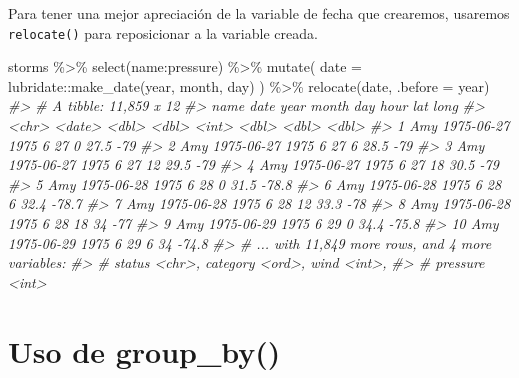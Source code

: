 \documentclass[
]{book}
\newenvironment{Shaded}{\begin{snugshade}}{\end{snugshade}}
\newcommand{\AttributeTok}[1]{\textcolor[rgb]{0.77,0.63,0.00}{#1}}
\newcommand{\CommentTok}[1]{\textcolor[rgb]{0.56,0.35,0.01}{\textit{#1}}}
\newcommand{\FunctionTok}[1]{\textcolor[rgb]{0.00,0.00,0.00}{#1}}
\newcommand{\NormalTok}[1]{#1}
\newcommand{\SpecialCharTok}[1]{\textcolor[rgb]{0.00,0.00,0.00}{#1}}
\begin{document}
Para tener una mejor apreciación de la variable de fecha que crearemos, usaremos \texttt{relocate()} para reposicionar a la variable creada.

\begin{Shaded}
\begin{Highlighting}[]
\NormalTok{storms }\SpecialCharTok{\%\textgreater{}\%}
  \FunctionTok{select}\NormalTok{(name}\SpecialCharTok{:}\NormalTok{pressure) }\SpecialCharTok{\%\textgreater{}\%}
  \FunctionTok{mutate}\NormalTok{(}
    \AttributeTok{date =}\NormalTok{ lubridate}\SpecialCharTok{::}\FunctionTok{make\_date}\NormalTok{(year, month, day)}
\NormalTok{  ) }\SpecialCharTok{\%\textgreater{}\%}
  \FunctionTok{relocate}\NormalTok{(date, }\AttributeTok{.before =}\NormalTok{ year)}
\CommentTok{\#\textgreater{} \# A tibble: 11,859 x 12}
\CommentTok{\#\textgreater{}    name  date        year month   day  hour   lat  long}
\CommentTok{\#\textgreater{}    \textless{}chr\textgreater{} \textless{}date\textgreater{}     \textless{}dbl\textgreater{} \textless{}dbl\textgreater{} \textless{}int\textgreater{} \textless{}dbl\textgreater{} \textless{}dbl\textgreater{} \textless{}dbl\textgreater{}}
\CommentTok{\#\textgreater{}  1 Amy   1975{-}06{-}27  1975     6    27     0  27.5 {-}79  }
\CommentTok{\#\textgreater{}  2 Amy   1975{-}06{-}27  1975     6    27     6  28.5 {-}79  }
\CommentTok{\#\textgreater{}  3 Amy   1975{-}06{-}27  1975     6    27    12  29.5 {-}79  }
\CommentTok{\#\textgreater{}  4 Amy   1975{-}06{-}27  1975     6    27    18  30.5 {-}79  }
\CommentTok{\#\textgreater{}  5 Amy   1975{-}06{-}28  1975     6    28     0  31.5 {-}78.8}
\CommentTok{\#\textgreater{}  6 Amy   1975{-}06{-}28  1975     6    28     6  32.4 {-}78.7}
\CommentTok{\#\textgreater{}  7 Amy   1975{-}06{-}28  1975     6    28    12  33.3 {-}78  }
\CommentTok{\#\textgreater{}  8 Amy   1975{-}06{-}28  1975     6    28    18  34   {-}77  }
\CommentTok{\#\textgreater{}  9 Amy   1975{-}06{-}29  1975     6    29     0  34.4 {-}75.8}
\CommentTok{\#\textgreater{} 10 Amy   1975{-}06{-}29  1975     6    29     6  34   {-}74.8}
\CommentTok{\#\textgreater{} \# ... with 11,849 more rows, and 4 more variables:}
\CommentTok{\#\textgreater{} \#   status \textless{}chr\textgreater{}, category \textless{}ord\textgreater{}, wind \textless{}int\textgreater{},}
\CommentTok{\#\textgreater{} \#   pressure \textless{}int\textgreater{}}
\end{Highlighting}
\end{Shaded}

\hypertarget{uso-de-group_by}{%
\section{Uso de group\_by()}\label{uso-de-group_by}}
\end{document}
